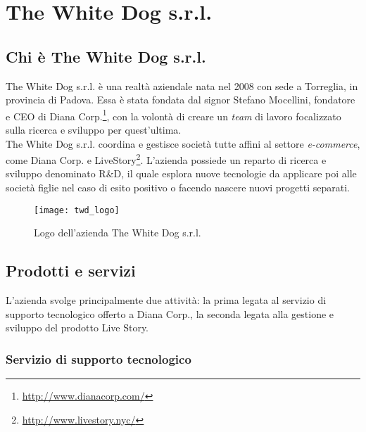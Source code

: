\chapter{The White Dog s.r.l.}
\label{cap:thewhitedog}

\section{Chi è The White Dog s.r.l.}

The White Dog s.r.l. è una realtà aziendale nata nel 2008 con sede a Torreglia, in provincia di Padova. Essa è stata fondata dal signor Stefano Mocellini, fondatore e CEO di Diana Corp.\footnote[1]{\url{http://www.dianacorp.com/}}, con la volontà di creare un \textit{team} di lavoro focalizzato sulla ricerca e sviluppo per quest'ultima. \\
The White Dog s.r.l. coordina e gestisce società tutte affini al settore \textit{e-commerce}, come Diana Corp. e LiveStory\footnote[2]{\url{http://www.livestory.nyc/}}. L'azienda possiede un reparto di ricerca e sviluppo denominato R\&D, il quale esplora nuove tecnologie da applicare poi alle società figlie nel caso di esito positivo o facendo nascere nuovi progetti separati.

\label{The White Dog s.r.l.}
\begin{figure}[ht]
	\begin{center}
		\texttt{[image: twd\_logo]}
		\caption{Logo dell'azienda The White Dog s.r.l.}
	\end{center}
\end{figure}
\FloatBarrier

\section{Prodotti e servizi}

L'azienda svolge principalmente due attività: la prima legata al servizio di supporto tecnologico offerto a Diana Corp., la seconda legata alla gestione e sviluppo del prodotto Live Story.

\subsection{Servizio di supporto tecnologico}

